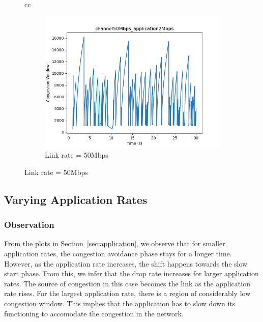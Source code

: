 \documentclass[11pt]{article}
\begin{document}
\begin{figure}[H]
\begin{tabular}[c]{cc}
      {\begin{subfigure}[c]{0.5\textwidth}
        \centering
        \includegraphics[width=\textwidth]{Q2/outputs/channel50Mbps_application2Mbps.png}
        \caption{Link rate = 50Mbps}
      \end{subfigure}}
    
  \end{tabular}
\end{figure}

\subsection{Varying Application Rates}
\subsubsection{Observation}
From the plots in Section~\ref{sec:application}, we observe that for smaller application rates, the congestion avoidance phase stays for a longer time. However, as the application rate increases, the shift happens towards the slow start phase. From this, we infer that the drop rate increases for larger application rates. The source of congestion in this case becomes the link as the application rate rises. For the largest application rate, there is a region of considerably low congestion window. This implies that the application has to slow down its functioning to accomodate the congestion in the network.
\end{document}
